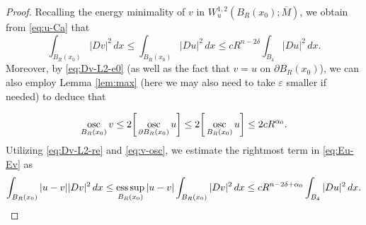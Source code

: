 \documentclass[11pt]{amsart}
\newcommand{\e}{\varepsilon}
\newcommand{\osc}{\operatornamewithlimits{osc}}
\newcommand{\esssup}{\operatornamewithlimits{ess\,sup}}
\theoremstyle{plain}
\theoremstyle{definition}
\theoremstyle{remark}
\numberwithin{equation}{section}
\begin{document}
\begin{proof}
Recalling the energy minimality of $v$ in $W_u^{1,2}(B_R(x_0);\overline M)$, we obtain from \eqref{eq:u-Ca} that 
\begin{equation}
    \label{eq:Dv-L2-re}
\int_{B_R(x_0)} |Dv|^2\,dx \leq \int_{B_R(x_0)} |Du|^2\,dx \leq cR^{n-2\delta}\int_{B_4}|Du|^2\,dx.
\end{equation}
Moreover, by \eqref{eq:Dv-L2-e0} (as well as the fact that $v = u$ on $\partial B_R(x_0)$), we can also employ Lemma \ref{lem:max} (here we may also need to take ${\e}$ smaller if needed) to deduce that  

\begin{equation}
    \label{eq:v-osc}
    \osc_{B_R(x_0)} v \leq 2 \bigg[\osc_{\partial B_R(x_0)} u\bigg] \leq 2 \bigg[\osc_{B_R(x_0)} u \bigg] \leq 2 
    c R^{\alpha_0}.
\end{equation}
Utilizing \eqref{eq:Dv-L2-re} and \eqref{eq:v-osc}, we estimate the rightmost term in \eqref{eq:Eu-Ev} as 
\begin{equation}
    \label{eq:II}
\int_{B_R(x_0)} |u-v||Dv|^2\,dx \leq \esssup_{B_R(x_0)}|u-v| \int_{B_R(x_0)} |Dv|^2\,dx \leq c R^{n-2\delta + \alpha_0}\int_{B_4} |Du|^2\,dx.
\end{equation}


\end{proof}
\end{document}
